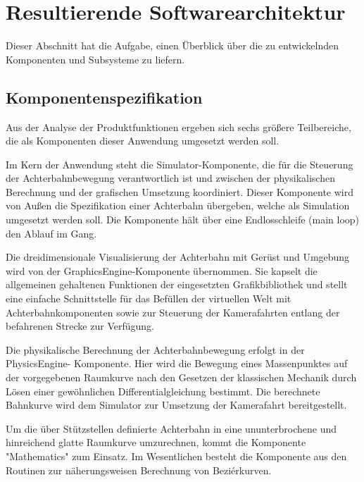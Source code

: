 \chapter{Resultierende Softwarearchitektur}

Dieser Abschnitt hat die Aufgabe, einen Überblick über die zu entwickelnden
Komponenten und Subsysteme zu liefern.
\section{Komponentenspezifikation}

Aus der Analyse der Produktfunktionen ergeben sich sechs größere Teilbereiche,
die als Komponenten dieser Anwendung umgesetzt werden soll.

Im Kern der Anwendung steht die Simulator-Komponente, die für die Steuerung der
Achterbahnbewegung verantwortlich ist und zwischen der physikalischen Berechnung
und der grafischen Umsetzung koordiniert. Dieser Komponente wird von Außen die
Spezifikation einer Achterbahn übergeben, welche als Simulation umgesetzt werden
soll. Die Komponente hält über eine Endlosschleife (main loop) den Ablauf im Gang.

Die dreidimensionale Visualisierung der Achterbahn mit Gerüst und Umgebung wird
von der GraphicsEngine-Komponente übernommen. Sie kapselt die allgemeinen gehaltenen
Funktionen der eingesetzten Grafikbibliothek und stellt eine einfache Schnittstelle
für das Befüllen der virtuellen Welt mit Achterbahnkomponenten sowie zur Steuerung
der Kamerafahrten entlang der befahrenen Strecke zur Verfügung.

Die physikalische Berechnung der Achterbahnbewegung erfolgt in der PhysicsEngine-
Komponente. Hier wird die Bewegung eines Massenpunktes auf der vorgegebenen Raumkurve
nach den Gesetzen der klassischen Mechanik durch Lösen einer gewöhnlichen 
Differentialgleichung bestimmt. Die berechnete Bahnkurve wird dem Simulator zur
Umsetzung der Kamerafahrt bereitgestellt.

Um die über Stützstellen definierte Achterbahn in eine ununterbrochene und hinreichend
glatte Raumkurve umzurechnen, kommt die Komponente "Mathematics" zum Einsatz. Im
Wesentlichen besteht die Komponente aus den Routinen zur näherungsweisen Berechnung
von Beziérkurven.

